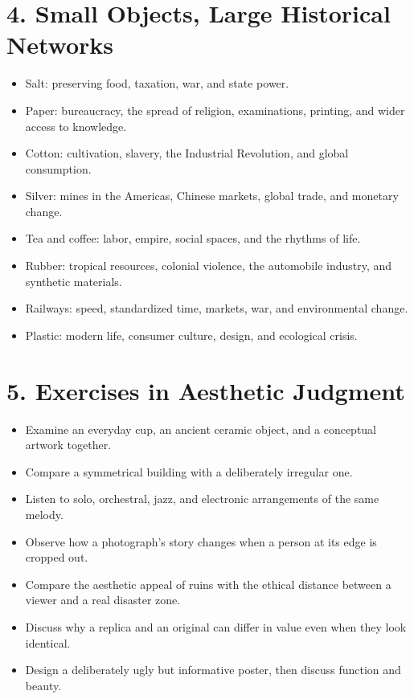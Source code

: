 \section*{4. Small Objects, Large Historical Networks}
\begin{itemize}
\item Salt: preserving food, taxation, war, and state power.
\item Paper: bureaucracy, the spread of religion, examinations, printing, and wider access to knowledge.
\item Cotton: cultivation, slavery, the Industrial Revolution, and global consumption.
\item Silver: mines in the Americas, Chinese markets, global trade, and monetary change.
\item Tea and coffee: labor, empire, social spaces, and the rhythms of life.
\item Rubber: tropical resources, colonial violence, the automobile industry, and synthetic materials.
\item Railways: speed, standardized time, markets, war, and environmental change.
\item Plastic: modern life, consumer culture, design, and ecological crisis.
\end{itemize}
\section*{5. Exercises in Aesthetic Judgment}
\begin{itemize}
\item Examine an everyday cup, an ancient ceramic object, and a conceptual artwork together.
\item Compare a symmetrical building with a deliberately irregular one.
\item Listen to solo, orchestral, jazz, and electronic arrangements of the same melody.
\item Observe how a photograph's story changes when a person at its edge is cropped out.
\item Compare the aesthetic appeal of ruins with the ethical distance between a viewer and a real disaster zone.
\item Discuss why a replica and an original can differ in value even when they look identical.
\item Design a deliberately ugly but informative poster, then discuss function and beauty.
\end{itemize}
